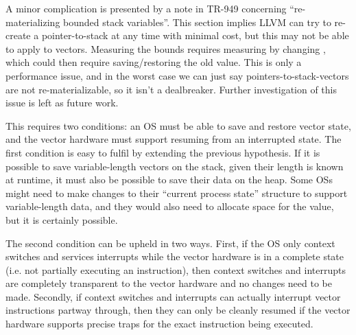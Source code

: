 \pagebreak
A minor complication is presented by a note in TR-949\cite[Section~3.8.2]{TR-949} concerning ``re-materializing bounded stack variables''.
This section implies LLVM can try to re-create a pointer-to-stack at any time with minimal cost, but this may not be able to apply to vectors.
Measuring the bounds requires measuring  by changing , which could then require saving/restoring the old value.
This is only a performance issue, and in the worst case we can just say pointers-to-stack-vectors are not re-materializable, so it isn't a dealbreaker.
Further investigation of this issue is left as future work.

This requires two conditions: an OS must be able to save and restore vector state, and the vector hardware must support resuming from an interrupted state.
The first condition is easy to fulfil by extending the previous hypothesis. 
If it is possible to save variable-length vectors on the stack, given their length is known at runtime, it must also be possible to save their data on the heap.
Some OSs might need to make changes to their ``current process state'' structure to support variable-length data, and they would also need to allocate space for the  value, but it is certainly possible.

The second condition can be upheld in two ways.
First, if the OS only context switches and services interrupts while the vector hardware is in a complete state (i.e. not partially executing an instruction), then context switches and interrupts are completely transparent to the vector hardware and no changes need to be made.
Secondly, if context switches and interrupts can actually interrupt vector instructions partway through, then they can only be cleanly resumed if the vector hardware supports precise traps for the exact instruction being executed.
